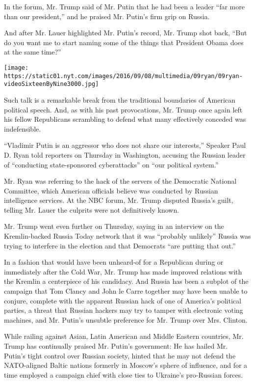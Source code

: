In the forum, Mr. Trump said of Mr. Putin that he had been a leader
``far more than our president,'' and he praised Mr. Putin's firm grip on
Russia.

And after Mr. Lauer highlighted Mr. Putin's record, Mr. Trump shot back,
``But do you want me to start naming some of the things that President
Obama does at the same time?''

\texttt{[image: https://static01.nyt.com/images/2016/09/08/multimedia/09ryan/09ryan-videoSixteenByNine3000.jpg]}

Such talk is a remarkable break from the traditional boundaries of
American political speech. And, as with his past provocations, Mr. Trump
once again left his fellow Republicans scrambling to defend what many
effectively conceded was indefensible.

``Vladimir Putin is an aggressor who does not share our interests,''
Speaker Paul D. Ryan told reporters on Thursday in Washington, accusing
the Russian leader of ``conducting state-sponsored cyberattacks'' on
``our political system.''

Mr. Ryan was referring to the hack of the servers of the Democratic
National Committee, which American officials believe was conducted by
Russian intelligence services. At the NBC forum, Mr. Trump disputed
Russia's guilt, telling Mr. Lauer the culprits were not definitively
known.

Mr. Trump went even further on Thursday, saying in an interview on the
Kremlin-backed Russia Today network that it was ``probably unlikely''
Russia was trying to interfere in the election and that Democrats ``are
putting that out.''

In a fashion that would have been unheard-of for a Republican during or
immediately after the Cold War, Mr. Trump has made improved relations
with the Kremlin a centerpiece of his candidacy. And Russia has been a
subplot of the campaign that Tom Clancy and John le Carre together may
have been unable to conjure, complete with the apparent Russian hack of
one of America's political parties, a threat that Russian hackers may
try to tamper with electronic voting machines, and Mr. Putin's unsubtle
preference for Mr. Trump over Mrs. Clinton.

While railing against Asian, Latin American and Middle Eastern
countries, Mr. Trump has continually praised Mr. Putin's government: He
has hailed Mr. Putin's tight control over Russian society, hinted that
he may not defend the NATO-aligned Baltic nations formerly in Moscow's
sphere of influence, and for a time employed a campaign chief with close
ties to Ukraine's pro-Russian forces.

